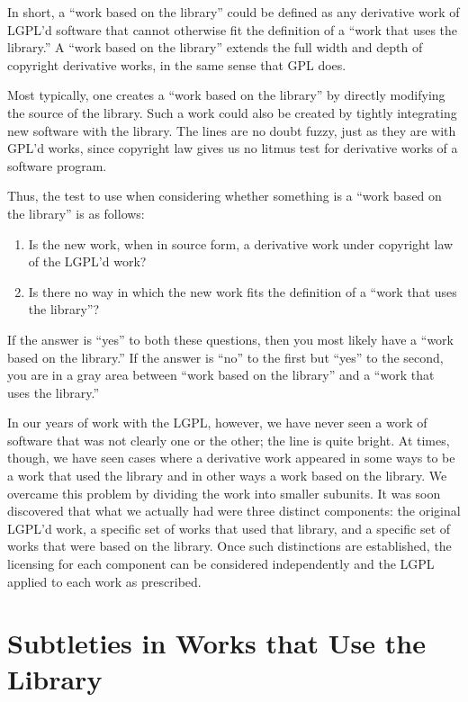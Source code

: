\documentclass[11pt, letterpaper]{book}
\begin{document}
In short, a ``work based on the library'' could be defined as any
derivative work of LGPL'd software that cannot otherwise fit the
definition of a ``work that uses the library.''  A ``work based on the
library'' extends the full width and depth of copyright derivative works,
in the same sense that GPL does.

Most typically, one creates a ``work based on the library'' by directly
modifying the source of the library. Such a work could also be created by
tightly integrating new software with the library. The lines are no doubt
fuzzy, just as they are with GPL'd works, since copyright law gives us no
litmus test for derivative works of a software program.

Thus, the test to use when considering whether something is a ``work
based on the library'' is as follows:

\begin{enumerate}

\item Is the new work, when in source form, a derivative work under
  copyright law of the LGPL'd work?

\item Is there no way in which the new work fits the definition of a
  ``work that uses the library''?
\end{enumerate}


If the answer is ``yes'' to both these questions, then you most likely
have a ``work based on the library.''  If the answer is ``no'' to the
first but ``yes'' to the second, you are in a gray area between ``work
based on the library'' and a ``work that uses the library.''

In our years of work with the LGPL, however, we have never seen a work
of software that was not clearly one or the other; the line is quite
bright. At times, though, we have seen cases where a derivative work
appeared in some ways to be a work that used the library and in other
ways a work based on the library. We overcame this problem by
dividing the work into smaller subunits. It was soon discovered that
what we actually had were three distinct components: the original
LGPL'd work, a specific set of works that used that library, and a
specific set of works that were based on the library. Once such
distinctions are established, the licensing for each component can be
considered independently and the LGPL applied to each work as
prescribed.


\section{Subtleties in Works that Use the Library}
\end{document}
